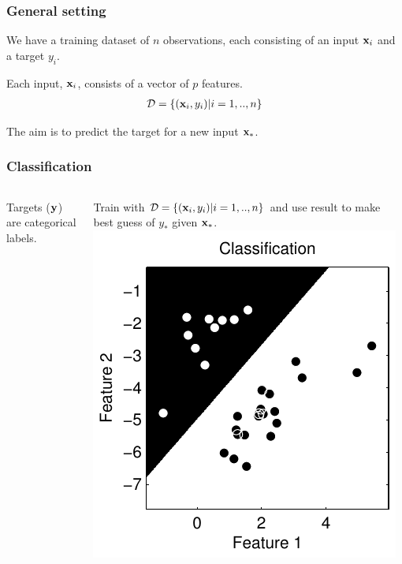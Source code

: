 \begin{frame}
\frametitle{General setting}
We have a training dataset of $n$ observations, each consisting of an input ${\bf x}_i$ and a target $y_i$.\par
Each input, ${\bf x}_i$, consists of a vector of $p$ features.
\begin{align*}
\mathcal{D} = \{({\bf x}_i,y_i) | i=1,..,n\}
\end{align*}

The aim is to predict the target for a new input ${\bf x}_*$.
\end{frame}

\begin{frame}
\frametitle{Classification}
\begin{columns}
Targets (${\bf y}$) are categorical labels.\par
Train with $\mathcal{D} = \{({\bf x}_i,y_i) | i=1,..,n\}$ and use result to make best guess of $y_*$ given ${\bf x}_*$.
\includegraphics[width=\textwidth]{simple_classification}
\end{columns}
\end{frame}

